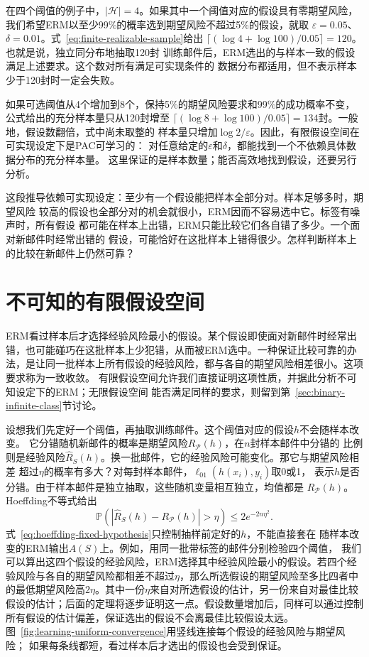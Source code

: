 在四个阈值的例子中，$|\mathcal H|=4$。如果其中一个阈值对应的假设具有零期望风险，
我们希望ERM以至少99\%的概率选到期望风险不超过5\%的假设，就取
$\varepsilon=0.05$、$\delta=0.01$。式~\eqref{eq:finite-realizable-sample}给出
$\lceil(\log4+\log100)/0.05\rceil=120$。也就是说，独立同分布地抽取120封
训练邮件后，ERM选出的与样本一致的假设满足上述要求。这个数对所有满足可实现条件的
数据分布都适用，但不表示样本少于120封时一定会失败。

如果可选阈值从4个增加到8个，保持5\%的期望风险要求和99\%的成功概率不变，
公式给出的充分样本量只从120封增至
$\lceil(\log8+\log100)/0.05\rceil=134$封。一般地，假设数翻倍，式中尚未取整的
样本量只增加$\log2/\varepsilon$。因此，有限假设空间在可实现设定下是PAC可学习的：
对任意给定的$\varepsilon$和$\delta$，都能找到一个不依赖具体数据分布的充分样本量。
这里保证的是样本数量；能否高效地找到假设，还要另行分析。

这段推导依赖可实现设定：至少有一个假设能把样本全部分对。样本足够多时，期望风险
较高的假设也全部分对的机会就很小，ERM因而不容易选中它。标签有噪声时，所有假设
都可能在样本上出错，ERM只能比较它们各自错了多少。一个面对新邮件时经常出错的
假设，可能恰好在这批样本上错得很少。怎样判断样本上的比较在新邮件上仍然可靠？

\section{不可知的有限假设空间}
\label{sec:binary-uniform-convergence}

ERM看过样本后才选择经验风险最小的假设。某个假设即使面对新邮件时经常出错，也可能碰巧在这批样本上少犯错，从而被ERM选中。一种保证比较可靠的办法，是让同一批样本上所有假设的经验风险，都与各自的期望风险相差很小。这项要求称为一致收敛。
有限假设空间允许我们直接证明这项性质，并据此分析不可知设定下的ERM；无限假设空间
能否满足同样的要求，则留到第~\ref{sec:binary-infinite-class}节讨论。

设想我们先定好一个阈值，再抽取训练邮件。这个阈值对应的假设$h$不会随样本改变。
它分错随机新邮件的概率是期望风险$R_{\mathcal P}(h)$，在$n$封样本邮件中分错的
比例则是经验风险$\hat R_S(h)$。换一批邮件，它的经验风险可能变化。那它与期望风险相差
超过$\eta$的概率有多大？对每封样本邮件，$\ell_{01}(h(x_i),y_i)$取0或1，
表示$h$是否分错。由于样本邮件是独立抽取，这些随机变量相互独立，均值都是
$R_{\mathcal P}(h)$。Hoeffding不等式给出
\begin{equation}
 \mathbb P\left(\left|\hat R_S(h)-R_{\mathcal P}(h)\right|>\eta\right)
 \leq2e^{-2n\eta^2}.
 \label{eq:hoeffding-fixed-hypothesis}
\end{equation}
式~\eqref{eq:hoeffding-fixed-hypothesis}只控制抽样前定好的$h$，不能直接套在
随样本改变的ERM输出$A(S)$上。例如，用同一批带标签的邮件分别检验四个阈值，
我们可以算出这四个假设的经验风险，ERM选择其中经验风险最小的假设。若四个经验风险与各自的期望风险都相差不超过$\eta$，那么所选假设的期望风险至多比四者中的最低期望风险高$2\eta$。其中一份$\eta$来自对所选假设的估计，另一份来自对最佳比较假设的估计；后面的定理将逐步证明这一点。假设数量增加后，同样可以通过控制所有假设的估计偏差，保证选出的假设不会离最佳比较假设太远。
图~\ref{fig:learning-uniform-convergence}用竖线连接每个假设的经验风险与期望风险；
如果每条线都短，看过样本后才选出的假设也会受到保证。

